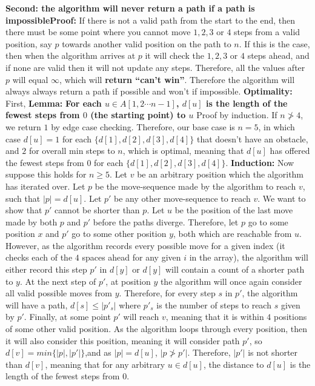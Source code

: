 \documentclass{article}
\begin{document}
\textbf{Second: the algorithm will never return a path if a path is impossible}\newline \textbf{Proof:} If there is not a valid path from the start to the end, then there must be some point where you cannot move $1,2,3$ or $4$ steps from a valid position, say $p$ towards another valid position on the path to $n$. If this is the case, then when the algorithm arrives at $p$ it will check the $1,2,3$ or $4$ steps ahead, and if none are valid then it will not update any steps. Therefore, all the values after $p$ will equal $\infty$, which will \textbf{return “can’t win”}. \newline
Therefore the algorithm will always always return a path if possible and won't if impossible. \newline\newline
\textbf{Optimality:} 
First, \textbf{Lemma:} \textbf{For each $u \in A[1, 2 \cdots n-1 ]$, $d[u]$ is the length of the fewest steps from $0$ (the starting point) to $u$} \newline 
Proof by induction. If $n \not >4$, we return $1$ by edge case checking. Therefore, our base case is $n=5$, in which case $d[u]=1$ for each $\{d[1],d[2],d[3],d[4]\}$ that doesn't have an obstacle, and $2$ for overall min steps to $n$, which is optimal, meaning that $d[u]$ has offered the fewest steps from $0$ for each $\{d[1],d[2],d[3],d[4]\}$. \newline
\textbf{Induction:} Now suppose this holds for $n \geq 5$. Let $v$ be an arbitrary position which the algorithm has iterated over. Let $p$ be the move-sequence made by the algorithm to reach $v$, such that $|p|=d[u]$. Let $p'$ be any other move-sequence to reach $v$. We want to show that $p'$ cannot be shorter than $p$. Let $u$ be the position of the last move made by both $p$ and $p'$ before the paths diverge. Therefore, let $p$ go to some position $x$ and $p'$ go to some other position $y$, both which are reachable from $u$. However, as the algorithm records every possible move for a given index (it checks each of the $4$ spaces ahead for any given $i$ in the array), the algorithm will either record this step $p'$ in $d[y]$ or $d[y]$ will contain a count of a shorter path to $y$. At the next step of $p'$, at position $y$ the algorithm will once again consider all valid possible moves from $y$. Therefore, for every step $s$ in $p'$, the algorithm will have a path, $d[s] \leq |p'_s|$ where $p'_s$ is the number of steps to reach $s$ given by $p'$. Finally, at some point $p'$ will reach $v$, meaning that it is within $4$ positions of some other valid position. As the algorithm loops through every position, then it will also consider this position, meaning it will consider path $p'$, so $d[v]=min\{|p|,|p'|\}$,and as $|p|=d[u]$, $|p \not > p'|$. Therefore, $|p'|$ is not shorter than $d[v]$, meaning that for any arbitrary $u \in d[u]$, the distance to $d[u]$ is the length of the fewest steps from $0$.\newline
\end{document}
